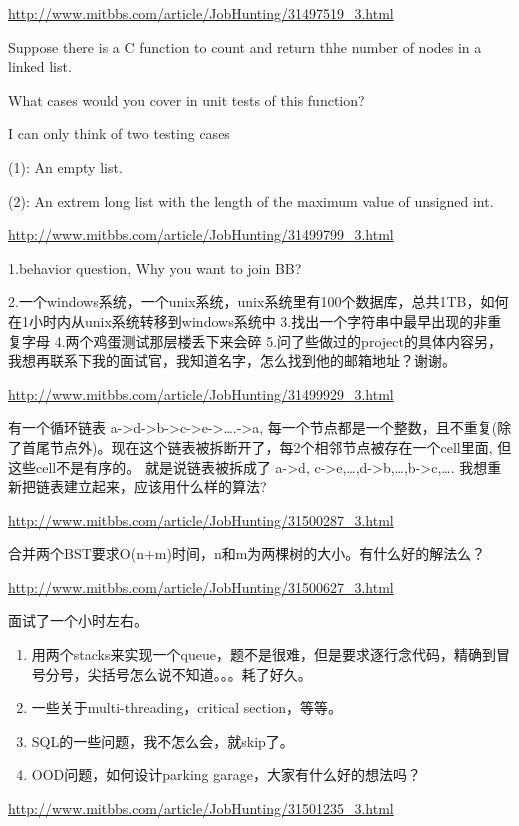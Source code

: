 \documentclass[12pt]{book}
\begin{document}
\url{http://www.mitbbs.com/article/JobHunting/31497519_3.html}

Suppose there is a C function to count and return thhe number of nodes in a linked list.

What cases would you cover in unit tests of this function?

I can only think of two testing cases

(1): An empty list.

(2): An extrem long list with the length of the maximum value of unsigned int.

\url{http://www.mitbbs.com/article/JobHunting/31499799_3.html}

1.behavior question, Why you want to join BB?

2.一个windows系统，一个unix系统，unix系统里有100个数据库，总共1TB，如何在1小时内从unix系统转移到windows系统中
3.找出一个字符串中最早出现的非重复字母
4.两个鸡蛋测试那层楼丢下来会碎
5.问了些做过的project的具体内容另，我想再联系下我的面试官，我知道名字，怎么找到他的邮箱地址？谢谢。

\url{http://www.mitbbs.com/article/JobHunting/31499929_3.html}

有一个循环链表 a->d->b->c->e->\ldots{}.->a, 每一个节点都是一个整数，且不重复(除了首尾节点外)。现在这个链表被拆断开了，每2个相邻节点被存在一个cell里面, 但这些cell不是有序的。 就是说链表被拆成了 a->d, c->e,\ldots{},d->b,\ldots{},b->c,\ldots{}. 我想重新把链表建立起来，应该用什么样的算法?

\url{http://www.mitbbs.com/article/JobHunting/31500287_3.html}

合并两个BST要求O(n+m)时间，n和m为两棵树的大小。有什么好的解法么？

\url{http://www.mitbbs.com/article/JobHunting/31500627_3.html}

面试了一个小时左右。

\begin{enumerate}
\item 用两个stacks来实现一个queue，题不是很难，但是要求逐行念代码，精确到冒号分号，尖括号怎么说不知道。。。耗了好久。
\item 一些关于multi-threading，critical section，等等。
\item SQL的一些问题，我不怎么会，就skip了。
\item OOD问题，如何设计parking garage，大家有什么好的想法吗？
\end{enumerate}

\url{http://www.mitbbs.com/article/JobHunting/31501235_3.html}
\end{document}

